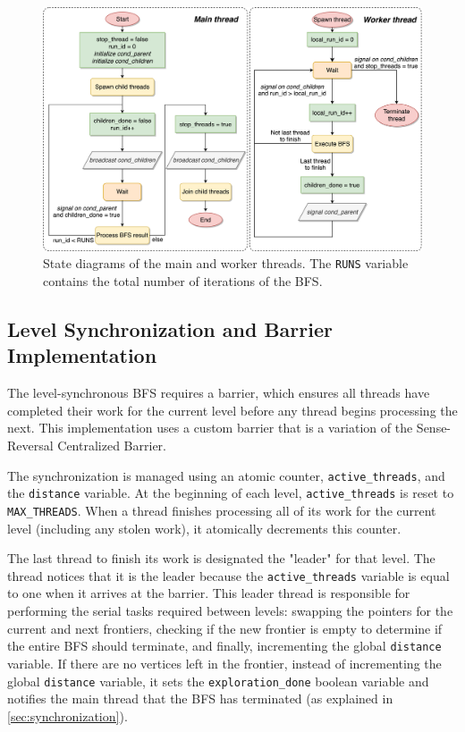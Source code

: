 \begin{figure}
    \centering
    \includegraphics[width=0.9\linewidth]{images/threads.png}
    \caption{State diagrams of the main and worker threads. The \texttt{RUNS} variable contains the total number of iterations of the BFS.}
    \label{fig:synchronization}
\end{figure}

\subsection{Level Synchronization and Barrier Implementation}

The level-synchronous BFS requires a barrier, which ensures all threads have completed their work for the current level before any thread begins processing the next. This implementation uses a custom barrier that is a variation of the Sense-Reversal Centralized Barrier.

The synchronization is managed using an atomic counter, \texttt{active\_threads}, and the \texttt{distance} variable. At the beginning of each level, \texttt{active\_threads} is reset to \texttt{MAX\_THREADS}. When a thread finishes processing all of its work for the current level (including any stolen work), it atomically decrements this counter.

The last thread to finish its work is designated the "leader" for that level. The thread notices that it is the leader because the \texttt{active\_threads} variable is equal to one when it arrives at the barrier. This leader thread is responsible for performing the serial tasks required between levels: swapping the pointers for the current and next frontiers, checking if the new frontier is empty to determine if the entire BFS should terminate, and finally, incrementing the global \texttt{distance} variable. If there are no vertices left in the frontier, instead of incrementing the global \texttt{distance} variable, it sets the \texttt{exploration\_done} boolean variable and notifies the main thread that the BFS has terminated (as explained in \cref{sec:synchronization}).

